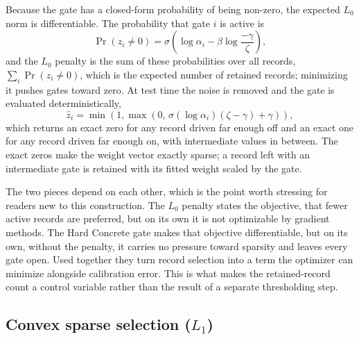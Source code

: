Because the gate has a closed-form probability of being non-zero, the expected $L_0$ norm is
differentiable. The probability that gate $i$ is active is
\begin{equation}
    \Pr(z_i \neq 0) = \sigma\!\left(\log \alpha_i - \beta \log \frac{-\gamma}{\zeta}\right),
    \label{eq:l0penalty}
\end{equation}
and the $L_0$ penalty is the sum of these probabilities over all records,
$\sum_i \Pr(z_i \neq 0)$, which is the expected number of retained records; minimizing it pushes
gates toward zero. At test time the noise is removed and the gate is evaluated deterministically,
\begin{equation}
    \hat{z}_i
    =
    \min\!\left(
        1,
        \max\!\left(
            0,\,
            \sigma(\log \alpha_i)(\zeta - \gamma) + \gamma
        \right)
    \right),
    \label{eq:deterministic_gate}
\end{equation}
which returns an exact zero for any record driven far enough off and an exact one for any record driven
far enough on, with intermediate values in between. The exact zeros make the weight vector exactly
sparse; a record left with an intermediate gate is retained with its fitted weight scaled by the gate.

The two pieces depend on each other, which is the point worth stressing for readers new to this
construction. The $L_0$ penalty states the objective, that fewer active records are preferred, but
on its own it is not optimizable by gradient methods. The Hard Concrete gate makes that objective
differentiable, but on its own, without the penalty, it carries no pressure toward sparsity and
leaves every gate open. Used together they turn record selection into a term the optimizer can
minimize alongside calibration error. This is what makes the retained-record count a control
variable rather than the result of a separate thresholding step.

\subsection{\texorpdfstring{Convex sparse selection ($L_1$)}{Convex sparse selection (L1)}}
\label{sec:l1_background}

